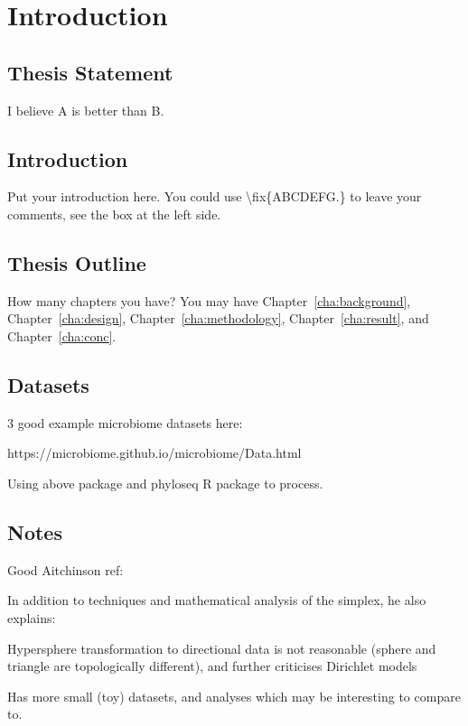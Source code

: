 \chapter{Introduction}
\label{cha:intro}


\section{Thesis Statement}
\label{sec:thesisstatement}
I believe A is better than B.


\section{Introduction}
\label{sec:problemstatement}
Put your introduction here. You could use \textbackslash fix\{ABCDEFG.\} to
leave your comments, see the box at the left side.  



\section{Thesis Outline}
\label{sec:outline}
How many chapters you have? You may have Chapter~\ref{cha:background},
Chapter~\ref{cha:design}, Chapter~\ref{cha:methodology},
Chapter~\ref{cha:result}, and Chapter~\ref{cha:conc}.


\section{Datasets}

3 good example microbiome datasets here:

https://microbiome.github.io/microbiome/Data.html

Using above package and phyloseq R package to process. 

\section{Notes}

Good Aitchinson ref:


In addition to techniques and mathematical analysis of the simplex, he also explains:

Hypersphere transformation to directional data is not reasonable (sphere and triangle are topologically different), and further criticises Dirichlet models 

Has more small (toy) datasets, and analyses which may be interesting to compare to. 
